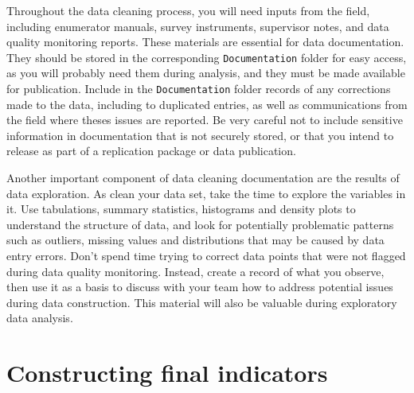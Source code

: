 Throughout the data cleaning process, you will need inputs from the field,
including enumerator manuals, survey instruments,
supervisor notes, and data quality monitoring reports.
These materials are essential for data documentation.
They should be stored in the corresponding \texttt{Documentation} folder for easy access,
as you will probably need them during analysis,
and they must be made available for publication.
Include in the \texttt{Documentation} folder records of any
corrections made to the data, including to duplicated entries,
as well as communications from the field where theses issues are reported.
Be very careful not to include sensitive information in documentation that is not securely stored,
or that you intend to release as part of a replication package or data publication.

Another important component of data cleaning documentation are the results of data exploration.
As clean your data set, take the time to explore the variables in it.
Use tabulations, summary statistics, histograms and density plots to understand the structure of data,
and look for potentially problematic patterns such as outliers,
missing values and distributions that may be caused by data entry errors.
Don't spend time trying to correct data points that were not flagged during data quality monitoring.
Instead, create a record of what you observe,
then use it as a basis to discuss with your team how to address potential issues during data construction.
This material will also be valuable during exploratory data analysis.

\section{Constructing final indicators}

